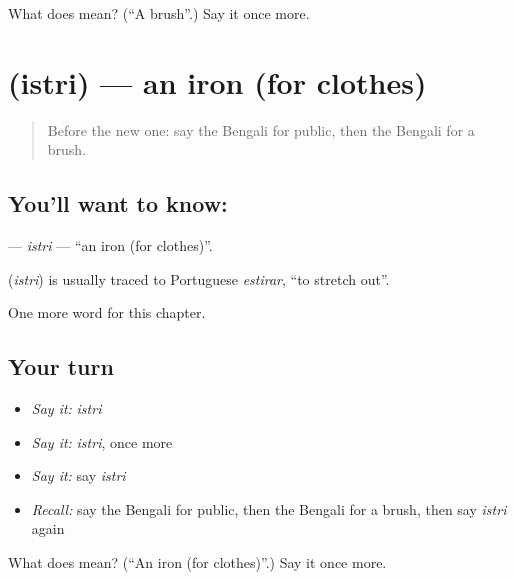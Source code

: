 \begin{tcolorbox}[breakable,colback=teal!4,colframe=teal!35!black,title={Before you move on}]
What does  mean? (\textquotedblleft{}A brush\textquotedblright{}.) Say it once more.
\end{tcolorbox}
\section[\texorpdfstring{\bn{ইস্ত্রি} (istri)}{ইস্ত্রি (istri)}]{ (istri) — an iron (for clothes)}

\label{lesson:BN-C194-istri}



\begin{quote}
Before the new one: say the Bengali for public, then the Bengali for a brush.
\end{quote}

\subsection*{You'll want to know: }
\textbf{} — \emph{istri} — \textquotedblleft{}an iron (for clothes)\textquotedblright{}.

\begin{cousinweb}
\textbf{} (\emph{istri}) is usually traced to Portuguese \emph{estirar}, \textquotedblleft{}to stretch out\textquotedblright{}.
\end{cousinweb}

\begin{grammarlens}[title={What you've built}]
One more word for this chapter.
\end{grammarlens}

\subsection*{Your turn}
\begin{itemize}
\raggedright
  \item \emph{Say it:} \emph{istri}
  \item \emph{Say it:} \emph{istri}, once more
  \item \emph{Say it:} say \emph{istri}
  \item \emph{Recall:} say the Bengali for public, then the Bengali for a brush, then say \emph{istri} again
\end{itemize}

\begin{tcolorbox}[breakable,colback=teal!4,colframe=teal!35!black,title={Before you move on}]
What does  mean? (\textquotedblleft{}An iron (for clothes)\textquotedblright{}.) Say it once more.
\end{tcolorbox}
